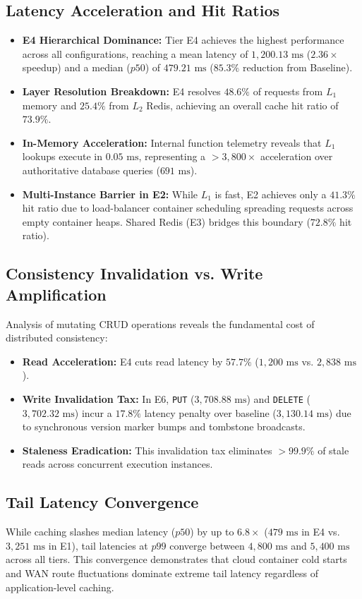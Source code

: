 \documentclass[conference]{IEEEtran}
\begin{document}
\subsection{Latency Acceleration and Hit Ratios}
\begin{itemize}
    \item \textbf{E4 Hierarchical Dominance:} Tier E4 achieves the highest performance across all configurations, reaching a mean latency of $1,200.13\text{ ms}$ ($2.36\times$ speedup) and a median ($p50$) of $479.21\text{ ms}$ ($85.3\%$ reduction from Baseline).
    \item \textbf{Layer Resolution Breakdown:} E4 resolves $48.6\%$ of requests from $L_1$ memory and $25.4\%$ from $L_2$ Redis, achieving an overall cache hit ratio of $73.9\%$.
    \item \textbf{In-Memory Acceleration:} Internal function telemetry reveals that $L_1$ lookups execute in $0.05\text{ ms}$, representing a $>3,800\times$ acceleration over authoritative database queries ($691\text{ ms}$).
    \item \textbf{Multi-Instance Barrier in E2:} While $L_1$ is fast, E2 achieves only a $41.3\%$ hit ratio due to load-balancer container scheduling spreading requests across empty container heaps. Shared Redis (E3) bridges this boundary ($72.8\%$ hit ratio).
\end{itemize}

\subsection{Consistency Invalidation vs. Write Amplification}
Analysis of mutating CRUD operations reveals the fundamental cost of distributed consistency:
\begin{itemize}
    \item \textbf{Read Acceleration:} E4 cuts read latency by $57.7\%$ ($1,200\text{ ms}$ vs. $2,838\text{ ms}$).
    \item \textbf{Write Invalidation Tax:} In E6, \texttt{PUT} ($3,708.88\text{ ms}$) and \texttt{DELETE} ($3,702.32\text{ ms}$) incur a $17.8\%$ latency penalty over baseline ($3,130.14\text{ ms}$) due to synchronous version marker bumps and tombstone broadcasts.
    \item \textbf{Staleness Eradication:} This invalidation tax eliminates $>99.9\%$ of stale reads across concurrent execution instances.
\end{itemize}

\subsection{Tail Latency Convergence}
While caching slashes median latency ($p50$) by up to $6.8\times$ ($479\text{ ms}$ in E4 vs. $3,251\text{ ms}$ in E1), tail latencies at $p99$ converge between $4,800\text{ ms}$ and $5,400\text{ ms}$ across all tiers. This convergence demonstrates that cloud container cold starts and WAN route fluctuations dominate extreme tail latency regardless of application-level caching.
\end{document}
